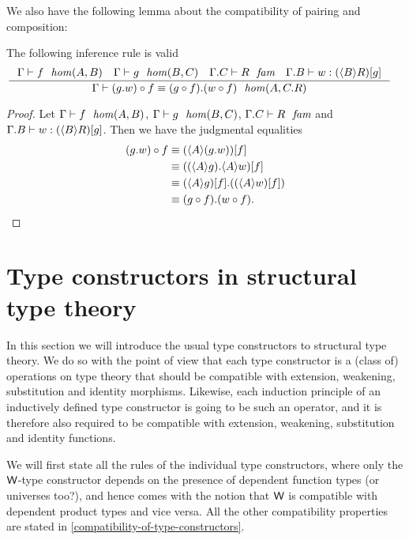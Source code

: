 We also have the following lemma about the compatibility of pairing and composition:

\begin{lem}
The following inference rule is valid
\begin{align*}
& \inference
  {\jhom{\Gamma}{A}{B}{f}
   \jhom{\Gamma}{B}{C}{g}
   \jfam{{\Gamma}{C}}{R}
   \jterm{{\Gamma}{B}}{\subst{g}{\ctxwk{B}{R}}}{w}}
  {\jhomeq{\Gamma}{A}{{C}{R}}
    {\jcomp{A}{f}{\ctxext{g}{w}}}
    {\ctxext{\jcomp{A}{f}{g}}{\jcomp{A}{f}{w}}}}
\end{align*}
\end{lem}

\begin{proof}
Let $\jhom{\Gamma}{A}{B}{f}$, $\jhom{\Gamma}{B}{C}{g}$, $\jfam{{\Gamma}{C}}{R}$
and $\jterm{{\Gamma}{B}}{\subst{g}{\ctxwk{B}{R}}}{w}$. Then we have the
judgmental equalities
\begin{align*}
\jcomp{A}{f}{\ctxext{g}{w}}
& \jdeq \subst{f}{\ctxwk{A}{\ctxext{g}{w}}}\\
& \jdeq \subst{f}{\ctxext{\ctxwk{A}{g}}{\ctxwk{A}{w}}}\\
& \jdeq \ctxext{\subst{f}{\ctxwk{A}{g}}}{\subst{f}{\ctxwk{A}{w}}}\\
& \jdeq \ctxext{\jcomp{A}{f}{g}}{\jcomp{A}{f}{w}}.
\end{align*}
\end{proof}
%

\section{Type constructors in structural type theory}
In this section we will introduce the usual type constructors to structural
type theory. We do so with the point of view that each type constructor is a
(class of) operations on type theory that should be compatible with extension,
weakening, substitution and identity morphisms. Likewise, each induction
principle of an inductively defined type constructor is going to be such an
operator, and it is therefore also required to be compatible with extension,
weakening, substitution and identity functions.

We will first state all the rules of the individual type constructors, where
only the ${\mathsf{W}}$-type constructor depends on the presence of dependent
function types (or universes too?), and hence comes with the notion that ${\mathsf{W}}$
is compatible with dependent product types and vice versa. All the other
compatibility properties are stated in \autoref{compatibility-of-type-constructors}.

